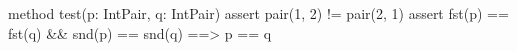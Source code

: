 method test(p: IntPair, q: IntPair) {
    assert pair(1, 2) != pair(2, 1)
    assert fst(p) == fst(q) && snd(p) == snd(q) ==> p == q
}